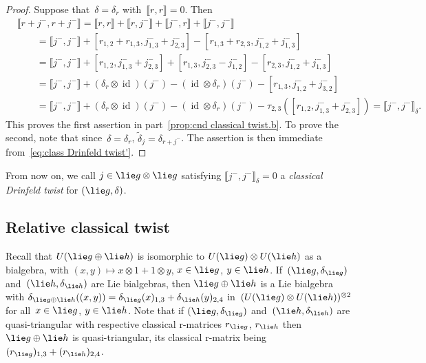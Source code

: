 \documentclass[12pt, reqno]{amsart}
\newcommand{\cybe}[1]{\mathbb{\Lbrack}#1,#1\mathbb{\Rbrack}}
\newcommand{\cyb}[2]{\mathbb{\Lbrack}#1,#2\mathbb{\Rbrack}}
\theoremstyle{definition}
\numberwithin{equation}{section}
\newcommand{\tensor}{\otimes}
\DeclareMathOperator{\id}{id}
\begin{document}
\begin{proof}
Suppose that~$\delta=\delta_{r}$ with~$\cybe{r}=0$. Then
\begin{align*}
&\cybe{r+ j ^-}=
\cybe{r}+\cyb{r}{ j ^-}+\cyb{ j ^-}{r}
+\cybe{ j ^-}\\
&\qquad=\cybe{ j ^-}+[r_{1,2}+r_{1,3}, j ^-_{1,3}+ j ^-_{2,3}]-[r_{1,3}+r_{2,3}, j ^-_{1,2}+ j ^-_{1,3}]\\
&\qquad=\cybe{ j ^-}+
[r_{1,2}, j ^-_{1,3}+ j ^-_{2,3}]
+[r_{1,3}, j ^-_{2,3}- j ^-_{1,2}]-[r_{2,3}, j ^-_{1,2}+ j ^-_{1,3}]
\\
&\qquad=\cybe{ j ^-}+(\delta_{r}\tensor\id)( j ^-)-(\id\tensor\delta_{r})( j ^-)-[r_{1,3}, j ^-_{1,2}+ j ^-_{3,2}]\\
&\qquad=\cybe{ j ^-}+(\delta_{r}\tensor\id)( j ^-)-(\id\tensor\delta_{r})( j ^-)-\tau_{2,3}([r_{1,2}, j ^-_{1,3}+ j ^-_{2,3}])=\cybe{ j ^-}_\delta.
\end{align*}
This proves the first assertion in part~\ref{prop:cnd classical twist.b}.
To prove the second, note that since~$\delta=\delta_{r}$,
$\tilde\delta_{ j }=\delta_{r+ j ^-}$. The assertion
is then immediate from~\eqref{eq:class Drinfeld twist'}.
\end{proof}
From now on, we call $ j \in\lie g\tensor\lie g$ satisfying
$\cybe{ j ^-}_\delta=0$ a {\em classical Drinfeld twist} for $(\lie g,\delta)$.

\subsection{Relative classical twist}\label{subs:rel clas twist}
Recall that $U(\lie g\oplus\lie h)$ is isomorphic 
to $U(\lie g)\tensor U(\lie h)$ as a bialgebra,
with $(x,y)\mapsto x\tensor 1+1\tensor y$, $x\in\lie g$, $y\in \lie h$. If~$(\lie g,\delta_{\lie g})$ and~$(\lie h,\delta_{\lie h})$ are Lie bialgebras, then 
$\lie g\oplus \lie h$ is a Lie bialgebra 
with $\delta_{\lie g\oplus\lie h}((x,y))=
\delta_{\lie g}(x)_{1,3}+
\delta_{\lie h}(y)_{2,4}$ in~$(U(\lie g)\tensor U(\lie h))^{\tensor 2}$ for all~$x\in\lie g$, $y\in\lie h$.
Note that if $(\lie g,\delta_{\lie g})$ and~$(\lie h,\delta_{\lie h})$
are quasi-triangular with respective classical r-matrices 
$r_{\lie g}$, $r_{\lie h}$ then~$\lie g\oplus \lie h$
is quasi-triangular, its classical r-matrix 
being $(r_{\lie g})_{1,3}+(r_{\lie h})_{2,4}$.
\end{document}
